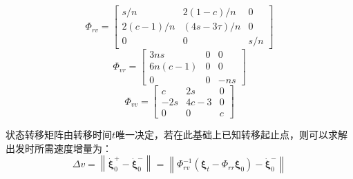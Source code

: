 \documentclass[10.5pt,twocolumn]{aaas}
\begin{document}
\begin{equation}
  \Phi_{rv}=
  \begin{bmatrix}
    s/n      & 2(1-c)/n     & 0   \\
    2(c-1)/n & (4s-3\tau)/n & 0   \\
    0        & 0            & s/n
  \end{bmatrix}
\end{equation}
\begin{equation}
  \Phi_{vr}=
  \begin{bmatrix}
    3ns     & 0 & 0   \\
    6n(c-1) & 0 & 0   \\
    0       & 0 & -ns
  \end{bmatrix}
\end{equation}
\begin{equation}
  \Phi_{vv}=
  \begin{bmatrix}
    c   & 2s   & 0 \\
    -2s & 4c-3 & 0 \\
    0   & 0    & c
  \end{bmatrix}
\end{equation}

状态转移矩阵由转移时间$t$唯一决定，若在此基础上已知转移起止点，则可以求解出发时所需速度增量为：
\begin{equation}
  \Delta v = \left\|\dot{\boldsymbol{\xi}}_0^+ - \dot{\boldsymbol{\xi}}_0^-\right\|
  = \left\|\Phi_{rv}^{-1}\left(\boldsymbol{\xi}_t - \Phi_{rr}\boldsymbol{\xi}_0 \right)-\dot{\boldsymbol{\xi}}_0^-\right\|
  \label{eq:segment-impulse}
\end{equation}
\end{document}
